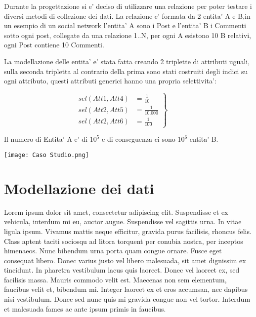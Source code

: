 Durante la progettazione si e' deciso di utilizzare una relazione per poter testare i diversi metodi di collezione dei dati.
La relazione e' formata da 2 entita' A e B,in un esempio di un social network l'entita' A sono i Post e l'entita' B i Commenti sotto ogni post, collegate da una relazione 1..N,
per ogni A esistono 10 B relativi, ogni Post contiene 10 Commenti.

La modellazione delle entita' e' stata fatta creando 2 triplette di attributi uguali, sulla seconda tripletta al contrario della prima sono stati costruiti degli indici su ogni attributo,
questi attributi generici hanno una propria selettivita':

    \begin{equation*}
        \left.\begin{aligned}
         sel(Att1, Att4) &= \frac{1}{10}    \\
         sel(Att2, Att5) &= \frac{1}{10.000} \\
         sel(Att2, Att6) &= \frac{1}{100}
        \end{aligned}
        \right\}
        \qquad 
        \end{equation*}

Il numero di Entita' A e' di $10^5$ e di conseguenza ci sono $10^6$ entita' B.

\begin{center}
    \texttt{[image: Caso Studio.png]}
\end{center}


\section{Modellazione dei dati}
Lorem ipsum dolor sit amet, consectetur adipiscing elit. Suspendisse et ex vehicula, interdum mi eu, auctor augue. Suspendisse vel sagittis urna. In vitae ligula ipsum. Vivamus mattis neque efficitur, gravida purus facilisis, rhoncus felis. Class aptent taciti sociosqu ad litora torquent per conubia nostra, per inceptos himenaeos. Nunc bibendum urna porta quam congue ornare. Fusce eget consequat libero. Donec varius justo vel libero malesuada, sit amet dignissim ex tincidunt. In pharetra vestibulum lacus quis laoreet. Donec vel laoreet ex, sed facilisis massa. Mauris commodo velit est. Maecenas non sem elementum, faucibus velit et, bibendum mi. Integer laoreet ex et eros accumsan, nec dapibus nisi vestibulum. Donec sed nunc quis mi gravida congue non vel tortor. Interdum et malesuada fames ac ante ipsum primis in faucibus.

